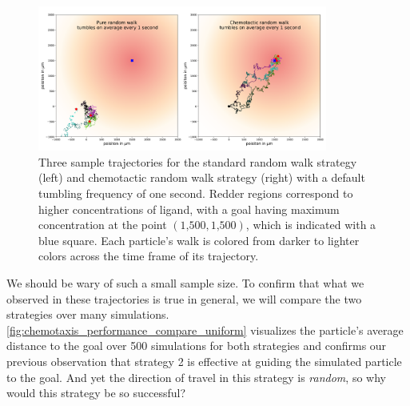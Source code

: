 \begin{figure}[h]
\centering
\mySfFamily
\includegraphics[width = 0.85\textwidth]{../images/chemotaxis_traj_compare_uniform.png}
\caption{Three sample trajectories for the standard random walk strategy (left) and chemotactic random walk strategy (right) with a default tumbling frequency of one second. Redder regions correspond to higher concentrations of ligand, with a goal having maximum concentration at the point $(\text{1,500}, \text{1,500})$, which is indicated with a blue square. Each particle's walk is colored from darker to lighter colors across the time frame of its trajectory.}
\label{fig:chemotaxis_traj_compare_uniform}
\end{figure}

We should be wary of such a small sample size. To confirm that what we observed in these trajectories is true in general, we will compare the two strategies over many simulations. \autoref{fig:chemotaxis_performance_compare_uniform} visualizes the particle's average distance to the goal over 500 simulations for both strategies and confirms our previous observation that strategy 2 is effective at guiding the simulated particle to the goal. And yet the direction of travel in this strategy is \textit{random}, so why would this strategy be so successful?\\

